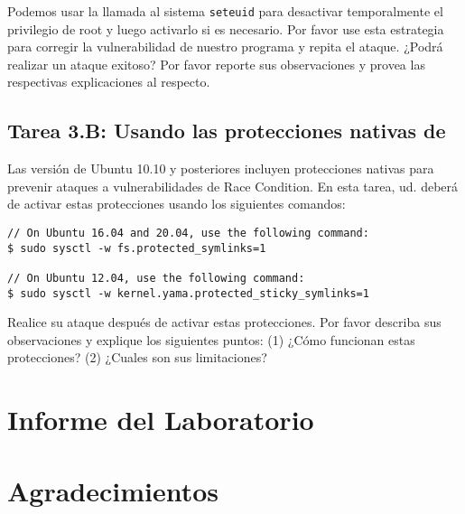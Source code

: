 Podemos usar la llamada al sistema  {\tt seteuid{}} para desactivar temporalmente el privilegio de root y luego activarlo si es necesario. Por favor use esta estrategia para corregir la vulnerabilidad de nuestro programa y repita el ataque. ¿Podrá realizar un ataque exitoso? Por favor reporte sus observaciones y provea las respectivas explicaciones al respecto.


\subsection{Tarea 3.B: Usando las protecciones nativas de \ubuntu}

Las versión de Ubuntu 10.10 y posteriores incluyen protecciones nativas para prevenir ataques a vulnerabilidades de Race Condition.
En esta tarea, ud. deberá de activar estas protecciones usando los siguientes comandos: 

\begin{lstlisting}
// On Ubuntu 16.04 and 20.04, use the following command:
$ sudo sysctl -w fs.protected_symlinks=1

// On Ubuntu 12.04, use the following command:
$ sudo sysctl -w kernel.yama.protected_sticky_symlinks=1
\end{lstlisting}

Realice su ataque después de activar estas protecciones.
Por favor describa sus observaciones y explique los siguientes puntos:
(1) ¿Cómo funcionan estas protecciones? 
(2) ¿Cuales son sus limitaciones?




\section{Informe del Laboratorio}



\section*{Agradecimientos}





